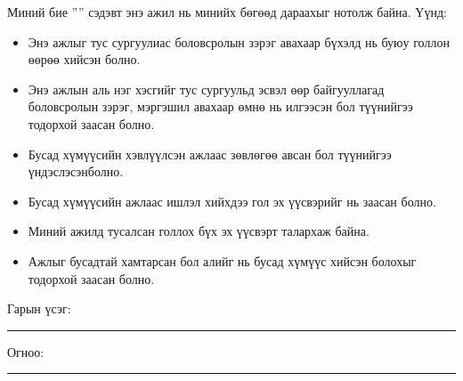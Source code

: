 \begin{declaration}
\addchaptertocentry{\authorshipname}

\noindent Миний бие \shortname  ''{\ttitle}'' сэдэвт энэ ажил нь минийх бөгөөд дараахыг нотолж байна. Үүнд:

\begin{itemize} 
\item Энэ ажлыг тус сургуулиас боловсролын зэрэг авахаар бүхэлд нь буюу голлон өөрөө хийсэн болно.
\item Энэ ажлын аль нэг хэсгийг тус сургуульд эсвэл өөр байгууллагад боловсролын зэрэг, мэргэшил авахаар өмнө нь илгээсэн бол түүнийгээ тодорхой заасан болно.
\item Бусад хүмүүсийн хэвлүүлсэн ажлаас зөвлөгөө авсан бол түүнийгээ үндэслэсэн\break болно.
\item Бусад хүмүүсийн ажлаас ишлэл хийхдээ гол эх үүсвэрийг нь заасан болно.
\item Миний ажилд тусалсан голлох бүх эх үүсвэрт талархаж байна.
\item Ажлыг бусадтай хамтарсан бол алийг нь бусад хүмүүс хийсэн болохыг тодорхой заасан болно.
\end{itemize}
\bigskip
 
\noindent Гарын үсэг: \rule[-0.5em]{12.7em}{0.5pt}
\bigskip

\noindent Огноо: \rule[-0.5em]{15em}{0.5pt}

\end{declaration}

\clearpage

